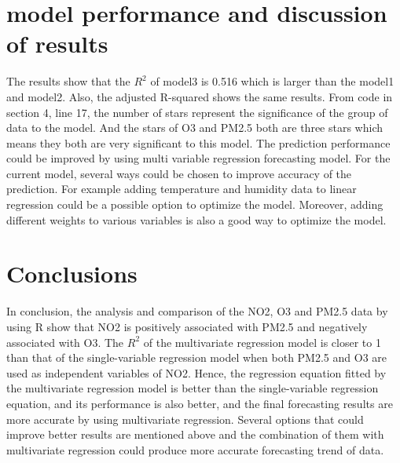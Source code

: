 \documentclass[a4paper,11pt,reqno]{report}
\begin{document}
\section{model performance and discussion of results}
\label{sec:model performance and discussion of results}

The results show that the $R^2$ of model3 is 0.516 which is larger than the model1 and model2. Also, the adjusted R-squared shows the same results.
From code in section 4, line 17, the number of stars represent the significance of the group of data to the model.
And the stars of O3 and PM2.5 both are three stars which means they both are very significant to this model.
The prediction performance could be improved by using multi variable regression forecasting model. For the current model, several ways could be chosen to improve accuracy of the prediction. For example adding temperature and humidity data to linear regression could be a possible option to optimize the model. 
Moreover, adding different weights to various variables is also a good way to optimize the model.


\section{Conclusions}
    In conclusion, the analysis and comparison of the NO2, O3 and PM2.5 data by using R show that NO2 is positively associated with PM2.5 and negatively associated with O3. The $R^2$ of the multivariate regression model is closer to 1 than that of the single-variable regression model when both PM2.5 and O3 are used as independent variables of NO2. Hence, the regression equation fitted by the multivariate regression model is better than the single-variable regression equation, and its performance is also better, and the final forecasting results are more accurate by using multivariate regression. Several options that could improve better results are mentioned above and the combination of them with multivariate regression could produce more accurate forecasting trend of data.





\end{document}
